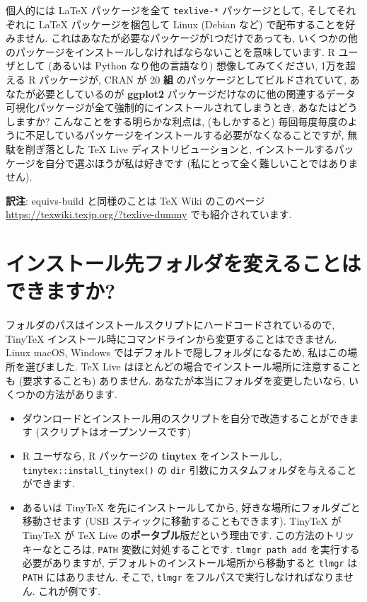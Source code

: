 \documentclass[
  xelatex,ja=standard,jafont=noto]{bxjsreport}
\begin{document}
個人的には LaTeX パッケージを全て \texttt{texlive-*} パッケージとして,
そしてそれぞれに LaTeX パッケージを梱包して Linux (Debian など)
で配布することを好みません.
これはあなたが必要なパッケージが1つだけであっても,
いくつかの他のパッケージをインストールしなければならないことを意味しています.
R ユーザとして (あるいは Python なり他の言語なり) 想像してみてください,
1万を超える R パッケージが, CRAN が 20 \textbf{組}
のパッケージとしてビルドされていて, あなたが必要としているのが
\textbf{ggplot2}
パッケージだけなのに他の関連するデータ可視化パッケージが全て強制的にインストールされてしまうとき,
あなたはどうしますか? こんなことをする明らかな利点は, (もしかすると)
毎回毎度毎度のように不足しているパッケージをインストールする必要がなくなることですが,
無駄を削ぎ落とした TeX Live ディストリビューションと,
インストールするパッケージを自分で選ぶほうが私は好きです
(私にとって全く難しいことではありません).

\textbf{訳注}: equivs-build と同様のことは TeX Wiki のこのページ
\url{https://texwiki.texjp.org/?texlive-dummy} でも紹介されています.

\hypertarget{change-directory}{%
\section{インストール先フォルダを変えることはできますか?}\label{change-directory}}

フォルダのパスはインストールスクリプトにハードコードされているので,
TinyTeX インストール時にコマンドラインから変更することはできません.
Linux macOS, Windows ではデフォルトで隠しフォルダになるため,
私はこの場所を選びました. TeX Live
はほとんどの場合でインストール場所に注意することも (要求することも)
ありません. あなたが本当にフォルダを変更したいなら,
いくつかの方法があります.

\begin{itemize}
\item
  ダウンロードとインストール用のスクリプトを自分で改造することができます
  (スクリプトはオープンソースです)
\item
  R ユーザなら, R パッケージの \textbf{tinytex} をインストールし,
  \texttt{tinytex::install\_tinytex()} の \texttt{dir}
  引数にカスタムフォルダを与えることができます.
\item
  あるいは TinyTeX を先にインストールしてから,
  好きな場所にフォルダごと移動させます (USB
  スティックに移動することもできます). TinyTeX が TinyTeX が TeX Live
  の\textbf{ポータブル}版だという理由です.
  この方法のトリッキーなところは, \texttt{PATH} 変数に対処することです.
  \texttt{tlmgr\ path\ add} を実行する必要がありますが,
  デフォルトのインストール場所から移動すると \texttt{tlmgr} は
  \texttt{PATH} にはありません. そこで, \texttt{tlmgr}
  をフルパスで実行しなければなりません. これが例です.
\end{itemize}
\end{document}
